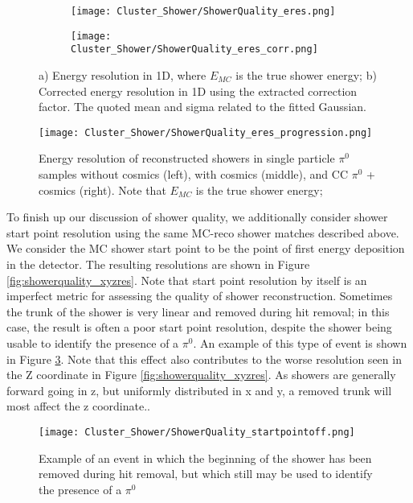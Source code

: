 \begin{figure}[t!]
  \begin{subfigure}[t]{0.4\textwidth}
\texttt{[image: Cluster\_Shower/ShowerQuality\_eres.png]}
  \caption{ }
  \end{subfigure} 
  \hspace{15mm}
  \begin{subfigure}[t]{0.4\textwidth}
\texttt{[image: Cluster\_Shower/ShowerQuality\_eres\_corr.png]}
  \caption{ }
  \end{subfigure} 
\caption{a) Energy resolution in 1D, where $E_{MC}$ is the true shower energy; b) Corrected energy resolution in 1D using the extracted correction factor. The quoted mean and sigma related to the fitted Gaussian.}
\label{fig:showerquality_eres_corr}
\end{figure}

\begin{figure}[t!]
\centering
 \texttt{[image: Cluster\_Shower/ShowerQuality\_eres\_progression.png]}
 \caption{Energy resolution of reconstructed showers in single particle $\pi^0$ samples without cosmics (left), with cosmics (middle), and CC $\pi^0$ + cosmics (right). Note that $E_{MC}$ is the true shower energy; }
\label{fig:showerquality_eres_series}
\end{figure}


To finish up our discussion of shower quality, we additionally consider shower start point resolution using the same MC-reco shower matches described above. We consider the MC shower start point to be the point of first energy deposition in the detector. The resulting resolutions are shown in Figure \ref{fig:showerquality_xyzres}. Note that start point resolution by itself is an imperfect metric for assessing the quality of shower reconstruction. Sometimes the trunk of the shower is very linear and removed during hit removal; in this case, the result is often a poor start point resolution, despite the shower being usable to identify the presence of a $\pi^0$. An example of this type of event is shown in Figure \ref{fig:showerquality_startpointoff}.  Note that this effect also contributes to the worse resolution seen in the Z coordinate in Figure \ref{fig:showerquality_xyzres}. As showers are generally forward going in z, but uniformly distributed in x and y, a removed trunk will most affect the z coordinate..

\begin{figure}[h!]
\centering
\texttt{[image: Cluster\_Shower/ShowerQuality\_startpointoff.png]}
\caption{Example of an event in which the beginning of the shower has been removed during hit removal, but which still may be used to identify the presence of a $\pi^0$ }
\label{fig:showerquality_startpointoff}
\end{figure}

